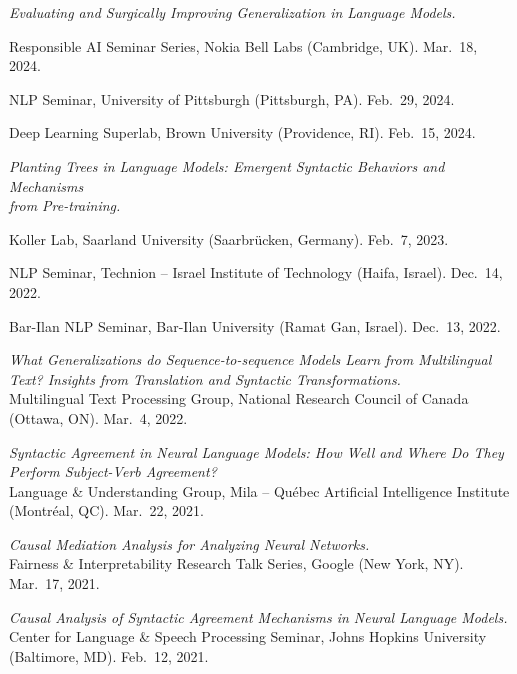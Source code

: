 \documentclass[10pt]{article}
\newcommand{\halfblankline}{\quad\vspace{-0.5\baselineskip}\pagebreak[3]}
\begin{document}
	\halfblankline

	\emph{Evaluating and Surgically Improving Generalization in Language Models.}
	\begin{innerlist}
	\item Responsible AI Seminar Series, Nokia Bell Labs (Cambridge, UK). Mar.\ 18, 2024.
	\item NLP Seminar, University of Pittsburgh (Pittsburgh, PA). Feb.\ 29, 2024.
	\item Deep Learning Superlab, Brown University (Providence, RI). Feb.\ 15, 2024.
	\end{innerlist}

	\halfblankline

	\emph{Planting Trees in Language Models: Emergent Syntactic Behaviors and Mechanisms\\from Pre-training.}
	\begin{innerlist}
	\item Koller Lab, Saarland University (Saarbrücken, Germany). Feb.\ 7, 2023.
	\item NLP Seminar, Technion -- Israel Institute of Technology (Haifa, Israel). Dec.\ 14, 2022.
	\item Bar-Ilan NLP Seminar, Bar-Ilan University (Ramat Gan, Israel). Dec.\ 13, 2022.
	\end{innerlist}

	\halfblankline

	\emph{What Generalizations do Sequence-to-sequence Models Learn from Multilingual Text? Insights from Translation and Syntactic Transformations.}\\Multilingual Text Processing Group, National Research Council of Canada (Ottawa, ON). Mar.\ 4, 2022.
	
	\halfblankline

	\emph{Syntactic Agreement in Neural Language Models: How Well and Where Do They Perform Subject-Verb Agreement?}\\Language \& Understanding Group, Mila -- Québec Artificial Intelligence Institute (Montréal, QC). Mar.\ 22, 2021.
	
	\halfblankline

	\emph{Causal Mediation Analysis for Analyzing Neural Networks.}\\Fairness \& Interpretability Research Talk Series, Google (New York, NY). Mar.\ 17, 2021.
	
	\halfblankline

	\emph{Causal Analysis of Syntactic Agreement Mechanisms in Neural Language Models.}\\Center for Language \& Speech Processing Seminar, Johns Hopkins University (Baltimore, MD). Feb.\ 12, 2021.
	
\end{document}

